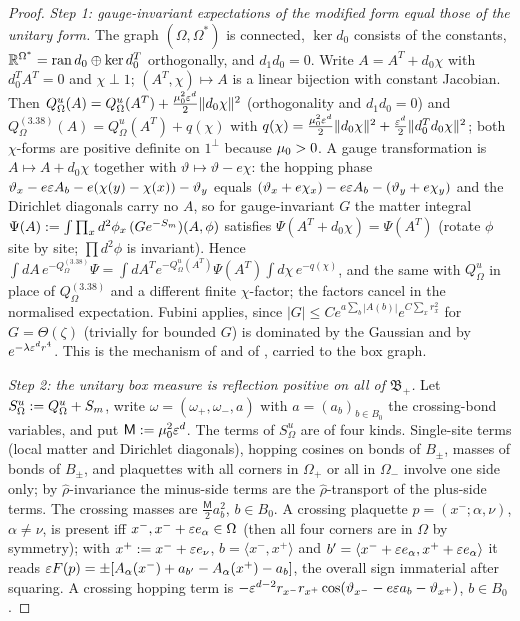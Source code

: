 \begin{proof}
\emph{Step 1: gauge-invariant expectations of the modified form equal those of the unitary form.} The graph $(\Omega,\Omega^*)$ is connected, $\ker d_0$ consists of the constants, $\mathbb R^{\Omega^*}=\operatorname{ran}d_0\oplus\ker d_0^T$ orthogonally, and $d_1d_0=0$. Write $A=A^T+d_0\chi$ with $d_0^TA^T=0$ and $\chi\perp1$; $(A^T,\chi)\mapsto A$ is a linear bijection with constant Jacobian. Then $Q^u_\Omega(A)=Q^u_\Omega(A^T)+\frac{\mu_0^2\varepsilon^d}2\|d_0\chi\|^2$ (orthogonality and $d_1d_0=0$) and $Q^{(3.38)}_\Omega(A)=Q^u_\Omega(A^T)+q(\chi)$ with $q(\chi)=\frac{\mu_0^2\varepsilon^d}2\|d_0\chi\|^2+\frac{\varepsilon^d}2\|d_0^Td_0\chi\|^2$; both $\chi$-forms are positive definite on $1^\perp$ because $\mu_0>0$. A gauge transformation is $A\mapsto A+d_0\chi$ together with $\vartheta\mapsto\vartheta-e\chi$: the hopping phase $\vartheta_x-e\varepsilon A_b-e(\chi(y)-\chi(x))-\vartheta_y$ equals $(\vartheta_x+e\chi_x)-e\varepsilon A_b-(\vartheta_y+e\chi_y)$ and the Dirichlet diagonals carry no $A$, so for gauge-invariant $G$ the matter integral $\Psi(A):=\int\prod_xd^2\phi_x\,(Ge^{-S_m})(A,\phi)$ satisfies $\Psi(A^T+d_0\chi)=\Psi(A^T)$ (rotate $\phi$ site by site; $\prod d^2\phi$ is invariant). Hence $\int dA\,e^{-Q^{(3.38)}_\Omega}\Psi=\int dA^Te^{-Q^u_\Omega(A^T)}\Psi(A^T)\int d\chi\,e^{-q(\chi)}$, and the same with $Q^u_\Omega$ in place of $Q^{(3.38)}_\Omega$ and a different finite $\chi$-factor; the factors cancel in the normalised expectation. Fubini applies, since $|G|\le Ce^{a\sum_b|A(b)|}e^{C\sum_xr_x^2}$ for $G=\Theta(\zeta)$ (trivially for bounded $G$) is dominated by the Gaussian and by $e^{-\lambda\varepsilon^d r^4}$. This is the mechanism of \cite[Thm.~5.1]{BFS1} and of \cite[lem:C-FP]{SymPhase}, carried to the box graph.

\emph{Step 2: the unitary box measure is reflection positive on all of $\mathfrak B_+$.} Let $S^u_\Omega:= Q^u_\Omega+S_m$, write $\omega=(\omega_+,\omega_-,a)$ with $a=(a_b)_{b\in B_0}$ the crossing-bond variables, and put $\mathsf M:=\mu_0^2\varepsilon^d$. The terms of $S^u_\Omega$ are of four kinds. Single-site terms (local matter and Dirichlet diagonals), hopping cosines on bonds of $B_\pm$, masses of bonds of $B_\pm$, and plaquettes with all corners in $\Omega_+$ or all in $\Omega_-$ involve one side only; by $\hat\rho$-invariance the minus-side terms are the $\hat\rho$-transport of the plus-side terms. The crossing masses are $\frac{\mathsf M}2a_b^2$, $b\in B_0$. A crossing plaquette $p=(x^-;\alpha,\nu)$, $\alpha\ne\nu$, is present iff $x^-,x^-+\varepsilon e_\alpha\in\Omega$ (then all four corners are in $\Omega$ by symmetry); with $x^+:= x^-+\varepsilon e_\nu$, $b=\langle x^-,x^+\rangle$ and $b'=\langle x^-+\varepsilon e_\alpha,x^++\varepsilon e_\alpha\rangle$ it reads $\varepsilon F(p)=\pm[A_\alpha(x^-)+a_{b'}-A_\alpha(x^+)-a_b]$, the overall sign immaterial after squaring. A crossing hopping term is $-\varepsilon^{d-2}r_{x^-}r_{x^+}\cos(\vartheta_{x^-}-e\varepsilon a_b-\vartheta_{x^+})$, $b\in B_0$.


\end{proof}
